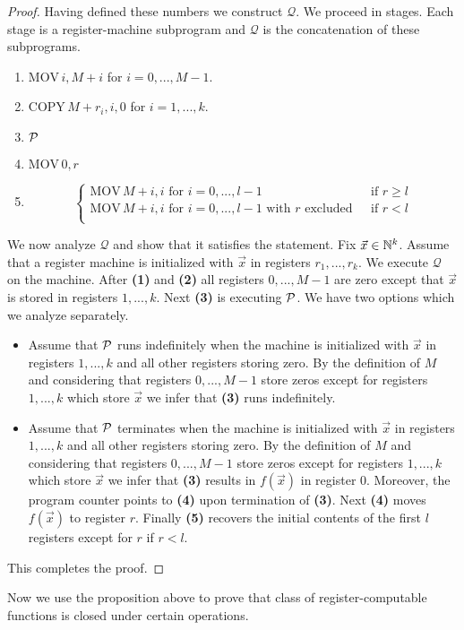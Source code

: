 \documentclass[10pt]{amsart}
\begin{document}
\begin{proof}
	Having defined these numbers we construct $\mathcal{Q}$. We proceed in stages. Each stage is a register-machine subprogram and $\mathcal{Q}$ is the concatenation of these subprograms.
	\begin{enumerate}[label=\textbf{(\arabic*)}, leftmargin=3.0em]
		\item $\mathrm{MOV}\,i,M + i$ for $i=0,...,M-1$.
		\item $\mathrm{COPY}\,M+r_i,i,0$ for $i=1,...,k$.
		\item ${\mathcal P}$
		\item $\mathrm{MOV}\,0,r$
		\item $$\begin{cases}
				      \mathrm{MOV}\,M + i,i\mbox{ for }i=0,...,l-1                                & \mbox{ if }r \geq l \\
				      \mathrm{MOV}\,M + i,i\mbox{ for }i=0,...,l-1\mbox{ with }r\mbox{ excluded } & \mbox{ if }r < l    \\
			      \end{cases}$$
	\end{enumerate}
	We now analyze $\mathcal{Q}$ and show that it satisfies the statement. Fix $\vec{x} \in {\mathbb N}^k$. Assume that a register machine is initialized with $\vec{x}$ in registers $r_1,...,r_k$. We execute $\mathcal{Q}$ on the machine. After \textbf{(1)} and \textbf{(2)} all registers $0,...,M - 1$ are zero except that $\vec{x}$ is stored in registers $1,...,k$. Next \textbf{(3)} is executing ${\mathcal P}$. We have two options which we analyze separately.
	\begin{itemize}
		\item Assume that ${\mathcal P}$ runs indefinitely when the machine is initialized with $\vec{x}$ in registers $1,...,k$ and all other registers storing zero. By the definition of $M$ and considering that registers $0,...,M-1$ store zeros except for registers $1,...,k$ which store $\vec{x}$ we infer that \textbf{(3)} runs indefinitely.
		\item Assume that ${\mathcal P}$ terminates when the machine is initialized with $\vec{x}$ in registers $1,...,k$ and all other registers storing zero. By the definition of $M$ and considering that registers $0,...,M-1$ store zeros except for registers $1,...,k$ which store $\vec{x}$ we infer that \textbf{(3)} results in $f(\vec{x})$ in register $0$. Moreover, the program counter points to \textbf{(4)} upon termination of \textbf{(3)}. Next \textbf{(4)} moves $f(\vec{x})$ to register $r$. Finally \textbf{(5)} recovers the initial contents of the first $l$ registers except for $r$ if $r < l$.
	\end{itemize}
	This completes the proof.
\end{proof}
\noindent
Now we use the proposition above to prove that class of register-computable functions is closed under certain operations.
\end{document}
